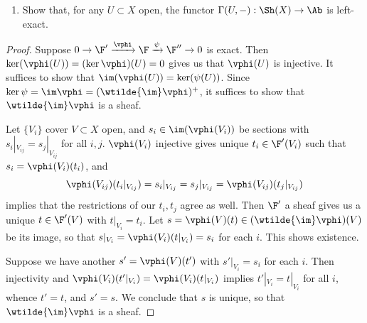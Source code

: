 \documentclass[12pt]{amsart}
\begin{document}
% 

\begin{enumerate}
	\item[8.] {
      Show that, for any $U\subset X$ open, the functor $\Gamma(U,-):\Sh(X)\to \Ab$ is left-exact.
    }
\end{enumerate}

\begin{proof}
  Suppose $0\to \F'\xrightarrow{\vphi}\F\xrightarrow{\psi}\F''\to 0$ is exact.
  Then $\ker(\vphi(U)) = (\ker\vphi)(U)=0$ gives us that $\vphi(U)$ is injective. 
  It suffices to show that $\im(\vphi(U))=\ker(\psi(U))$.
  Since $\ker\psi =\im\vphi = (\wtilde{\im}\vphi)^+$, it suffices to show that $\wtilde{\im}\vphi$ is a sheaf.

  Let $\{V_i\}$ cover $V\subset X$ open, and $s_i\in \im(\vphi(V_i))$ be sections with $s_i|_{V_{ij}}=s_j|_{V_{ij}}$ for all $i,j$.
  $\vphi(V_i)$ injective gives unique $t_i\in \F'(V_i)$ such that $s_i=\vphi(V_i)(t_i)$, and
  \[
    \vphi(V_{ij})(t_i|_{V_{ij}}) = s_i|_{V_{ij}}=s_j|_{V_{ij}} = \vphi(V_{ij})(t_j|_{V_{ij}})
  \] 
  implies that the restrictions of our $t_i,t_j$ agree as well.
  Then $\F'$ a sheaf gives us a unique $t\in \F'(V)$ with $t|_{V_i}=t_i$.
  Let $s=\vphi(V)(t)\in(\wtilde{\im}\vphi)(V)$ be its image, so that $s|_{V_i} = \vphi(V_i)(t|_{V_i}) = s_i$ for each $i$.
  This shows existence.

  Suppose we have another $s'=\vphi(V)(t')$ with $s'|_{V_i}=s_i$ for each $i$. 
  Then injectivity and $\vphi(V_i)(t'|_{V_i})= \vphi(V_i)(t|_{V_i})$ implies $t'|_{V_i}=t|_{V_i}$ for all $i$, whence $t'=t$, and $s'=s$.
  We conclude that $s$ is unique, so that $\wtilde{\im}\vphi$ is a sheaf.
\end{proof}
\end{document}

